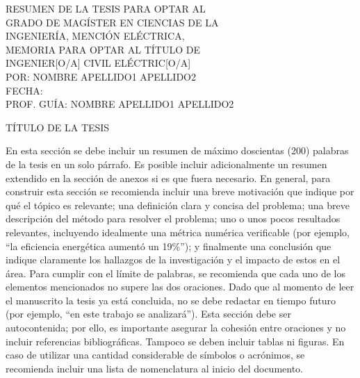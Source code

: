 \noindent\hfill
\begin{minipage}[t]{0.6\textwidth}
    RESUMEN DE LA TESIS PARA OPTAR AL \\
    GRADO DE MAGÍSTER EN CIENCIAS DE LA \\ INGENIERÍA, MENCIÓN ELÉCTRICA, \\
    MEMORIA PARA OPTAR AL TÍTULO DE \\ INGENIER[O/A] CIVIL ELÉCTRIC[O/A] \\
    {POR: NOMBRE APELLIDO1 APELLIDO2} \\
    {FECHA: \the\year} \\
    {PROF. GUÍA: NOMBRE APELLIDO1 APELLIDO2} \\
\end{minipage}

\begin{center}
    TÍTULO DE LA TESIS
\end{center}

\noindent En esta sección se debe incluir un resumen de máximo doscientas (200) palabras de la tesis en un solo párrafo. Es posible incluir adicionalmente un resumen extendido en la sección de anexos si es que fuera necesario. En general, para construir esta sección se recomienda incluir una breve motivación que indique por qué el tópico es relevante; una definición clara y concisa del problema; una breve descripción del método para resolver el problema; uno o unos pocos resultados relevantes, incluyendo idealmente una métrica numérica verificable (por ejemplo, ``la eficiencia energética aumentó un 19\%''); y finalmente una conclusión que indique claramente los hallazgos de la investigación y el impacto de estos en el área. Para cumplir con el límite de palabras, se recomienda que cada uno de los elementos mencionados no supere las dos oraciones. Dado que al momento de leer el manuscrito la tesis ya está concluida, no se debe redactar en tiempo futuro (por ejemplo, ``en este trabajo se analizará''). Esta sección debe ser autocontenida; por ello, es importante asegurar la cohesión entre oraciones y no incluir referencias bibliográficas. Tampoco se deben incluir tablas ni figuras. En caso de utilizar una cantidad considerable de símbolos o acrónimos, se recomienda incluir una lista de nomenclatura al inicio del documento.

